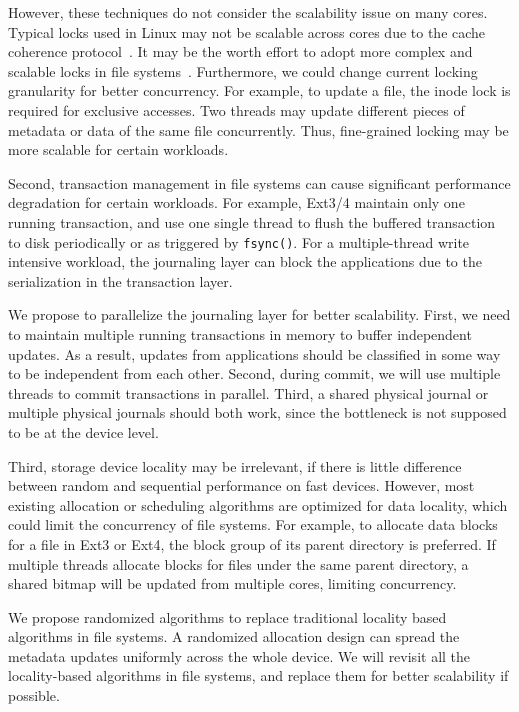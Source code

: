 However, these techniques do not consider the scalability issue on
many cores.  Typical locks used in Linux may not be scalable across 
cores due to the cache coherence protocol~\cite{David+13-Sync}.
It may be the worth effort to adopt more complex and scalable locks in
file systems~\cite{Mellor91-Locks}.  Furthermore, we could change
current locking granularity for better 
concurrency.  For example, to update a file, the inode lock is
required for exclusive accesses.  Two threads may update different
pieces of metadata or data of the same file concurrently.  Thus,
fine-grained locking may be more scalable for certain workloads.  

Second, transaction management in file systems can cause significant
performance degradation for certain workloads.  For example,
Ext3/4 maintain only one running transaction, and use one single
thread to flush the buffered transaction to disk periodically or 
as triggered by {\tt fsync()}.  For a multiple-thread write intensive 
workload, the journaling layer can block the applications due to the
serialization in the transaction layer.  

We propose to parallelize the journaling layer for better scalability.
First, we need to maintain multiple running transactions in memory to
buffer independent updates.  As a result, updates from 
applications should be classified in some way to be independent from
each other.  Second, during commit, we will use multiple threads to
commit transactions in parallel.  Third, a shared physical journal or
multiple physical journals should both work, since the bottleneck is
not supposed to be at the device level. 


Third, storage device locality may be irrelevant, if there is little
difference between random and sequential performance on fast devices.
However, most existing allocation or scheduling algorithms are
optimized for data locality, which could limit the concurrency of file
systems.  For example, to allocate data blocks for a file in Ext3 or
Ext4, the block group of its parent directory is preferred.  If
multiple threads allocate blocks for files under the same parent
directory, a shared bitmap will be updated from multiple cores,
limiting concurrency.  

We propose randomized algorithms to replace traditional locality based
algorithms in file systems.  A randomized allocation design can spread
the metadata updates uniformly across the whole device.  We will
revisit all the locality-based algorithms in file systems, and replace
them for better scalability if possible. 

